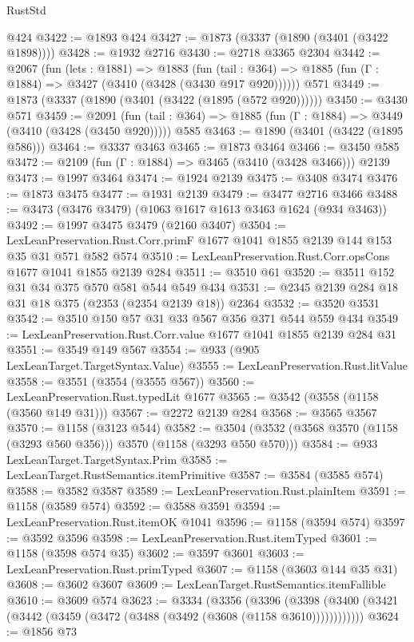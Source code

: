 \begin{lexlean}{RustStd}
\begin{coremodule}
    @424
@3422 := @1893 @424
@3427 := @1873 (@3337 (@1890 (@3401 (@3422 @1898))))
@3428 := @1932 @2716
@3430 := @2718 @3365 @2304
@3442 := @2067
    (fun (lets : @1881) =>
    @1883 (fun (tail : @364) => @1885 (fun (Γ : @1884) => @3427 (@3410 (@3428 (@3430 @917 @920))))))
    @571
@3449 := @1873 (@3337 (@1890 (@3401 (@3422 (@1895 (@572 @920))))))
@3450 := @3430 @571
@3459 := @2091
    (fun (tail : @364) => @1885 (fun (Γ : @1884) => @3449 (@3410 (@3428 (@3450 @920)))))
    @585
@3463 := @1890 (@3401 (@3422 (@1895 @586)))
@3464 := @3337 @3463
@3465 := @1873 @3464
@3466 := @3450 @585
@3472 := @2109 (fun (Γ : @1884) => @3465 (@3410 (@3428 @3466))) @2139
@3473 := @1997 @3464
@3474 := @1924 @2139
@3475 := @3408 @3474
@3476 := @1873 @3475
@3477 := @1931 @2139
@3479 := @3477 @2716 @3466
@3488 := @3473 (@3476 @3479) (@1063 @1617 @1613 @3463 @1624 (@934 @3463))
@3492 := @1997 @3475 @3479 (@2160 @3407)
@3504 := LexLeanPreservation.Rust.Corr.primF
    @1677
    @1041
    @1855
    @2139
    @144
    @153
    @35
    @31
    @571
    @582
    @574
@3510 := LexLeanPreservation.Rust.Corr.opsCons @1677 @1041 @1855 @2139 @284
@3511 := @3510 @61
@3520 := @3511 @152 @31 @34 @375 @570 @581 @544 @549 @434
@3531 := @2345 @2139 @284 @18 @31 @18 @375 (@2353 (@2354 @2139 @18)) @2364
@3532 := @3520 @3531
@3542 := @3510 @150 @57 @31 @33 @567 @356 @371 @544 @559 @434
@3549 := LexLeanPreservation.Rust.Corr.value @1677 @1041 @1855 @2139 @284 @31
@3551 := @3549 @149 @567
@3554 := @933 (@905 LexLeanTarget.TargetSyntax.Value)
@3555 := LexLeanPreservation.Rust.litValue
@3558 := @3551 (@3554 (@3555 @567))
@3560 := LexLeanPreservation.Rust.typedLit @1677
@3565 := @3542 (@3558 (@1158 (@3560 @149 @31)))
@3567 := @2272 @2139 @284
@3568 := @3565 @3567
@3570 := @1158 (@3123 @544)
@3582 := @3504 (@3532 (@3568 @3570 (@1158 (@3293 @560 @356))) @3570 (@1158 (@3293 @550 @570)))
@3584 := @933 LexLeanTarget.TargetSyntax.Prim
@3585 := LexLeanTarget.RustSemantics.itemPrimitive
@3587 := @3584 (@3585 @574)
@3588 := @3582 @3587
@3589 := LexLeanPreservation.Rust.plainItem
@3591 := @1158 (@3589 @574)
@3592 := @3588 @3591
@3594 := LexLeanPreservation.Rust.itemOK @1041
@3596 := @1158 (@3594 @574)
@3597 := @3592 @3596
@3598 := LexLeanPreservation.Rust.itemTyped
@3601 := @1158 (@3598 @574 @35)
@3602 := @3597 @3601
@3603 := LexLeanPreservation.Rust.primTyped
@3607 := @1158 (@3603 @144 @35 @31)
@3608 := @3602 @3607
@3609 := LexLeanTarget.RustSemantics.itemFallible
@3610 := @3609 @574
@3623 := @3334
    (@3356
      (@3396 (@3398 (@3400 (@3421 (@3442 (@3459 (@3472 (@3488 (@3492 (@3608 (@1158 @3610))))))))))))
@3624 := @1856 @73

\end{coremodule}
\end{lexlean}
